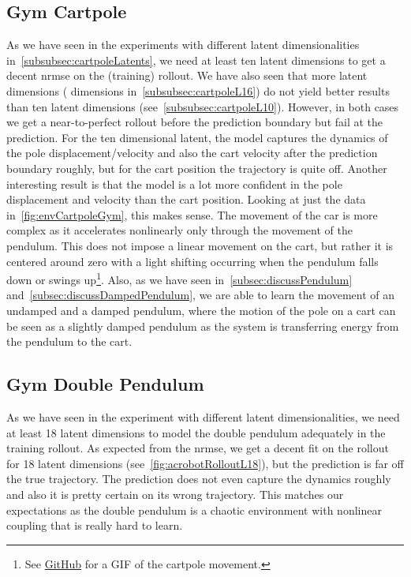 	\subsection{Gym Cartpole}
		As we have seen in the experiments with different latent dimensionalities in~\autoref{subsubsec:cartpoleLatents}, we need at least ten latent dimensions to get a decent \ac{nrmse} on the (training) rollout. We have also seen that more latent dimensions ( dimensions in~\autoref{subsubsec:cartpoleL16}) do not yield better results than ten latent dimensions (see~\autoref{subsubsec:cartpoleL10}). However, in both cases we get a near-to-perfect rollout before the prediction boundary but fail at the prediction. For the ten dimensional latent, the model captures the dynamics of the pole displacement/velocity and also the cart velocity after the prediction boundary roughly, but for the cart position the trajectory is quite off. Another interesting result is that the model is a lot more confident in the pole displacement and velocity than the cart position. Looking at just the data in~\autoref{fig:envCartpoleGym}, this makes sense. The movement of the car is more complex as it accelerates nonlinearly only through the movement of the pendulum. This does not impose a linear movement on the cart, but rather it is centered around zero with a light shifting occurring when the pendulum falls down or swings up\footnote{See \href{https://github.com/fdamken/bachelors-thesis/blob/b5a4acbc1d10fa0224a73201995222690d2fb6de/thesis/figures/cartpole.gif}{GitHub} for a GIF of the cartpole movement.}. Also, as we have seen in~\autoref{subsec:discussPendulum} and~\autoref{subsec:discussDampedPendulum}, we are able to learn the movement of an undamped and a damped pendulum, where the motion of the pole on a cart can be seen as a slightly damped pendulum as the system is transferring energy from the pendulum to the cart.

	\subsection{Gym Double Pendulum}
		As we have seen in the experiment with different latent dimensionalities, we need at least 18 latent dimensions to model the double pendulum adequately in the training rollout. As expected from the \ac{nrmse}, we get a decent fit on the rollout for 18 latent dimensions (see~\autoref{fig:acrobotRolloutL18}), but the prediction is far off the true trajectory. The prediction does not even capture the dynamics roughly and also it is pretty certain on its wrong trajectory. This matches our expectations as the double pendulum is a chaotic environment with nonlinear coupling that is really hard to learn.

